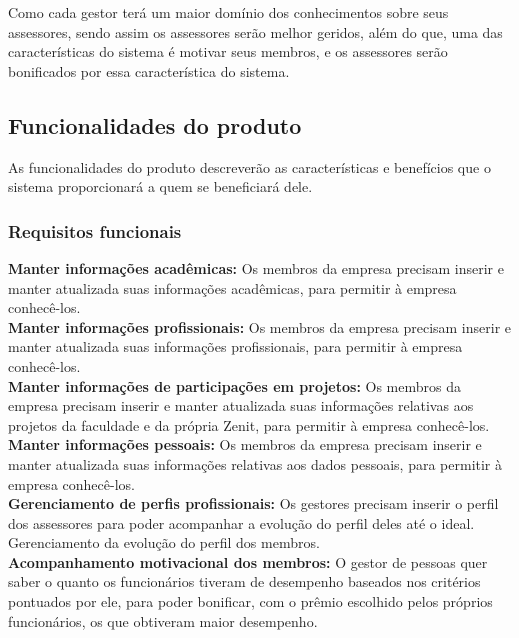 \begin{anexosenv}
Como cada gestor terá um maior domínio dos conhecimentos sobre seus assessores, sendo assim os assessores serão melhor geridos, além do que, uma das características do sistema é motivar seus membros, e os assessores serão bonificados por essa característica do sistema.\\

\subsection[Funcionalidades do produto]{Funcionalidades do produto}

As funcionalidades do produto descreverão as características e benefícios que o sistema proporcionará a quem se beneficiará dele.\\

\subsubsection[Requisitos funcionais]{Requisitos funcionais}

\textbf{Manter informações acadêmicas:} Os membros da empresa precisam inserir e manter atualizada suas informações acadêmicas, para permitir à empresa conhecê-los.\\

\textbf{Manter informações profissionais:} Os membros da empresa precisam inserir e manter atualizada suas informações profissionais, para permitir à empresa conhecê-los.\\

\textbf{Manter informações de participações em projetos:} Os membros da empresa precisam inserir e manter atualizada suas informações relativas aos projetos da faculdade e da própria Zenit, para permitir à empresa conhecê-los.\\

\textbf{Manter informações pessoais:} Os membros da empresa precisam inserir e manter atualizada suas informações relativas aos dados pessoais, para permitir à empresa conhecê-los.\\

\textbf{Gerenciamento de perfis profissionais:} Os gestores precisam inserir o perfil dos assessores para poder acompanhar a evolução do perfil deles até o ideal. Gerenciamento da evolução do perfil dos membros.\\

\textbf{Acompanhamento motivacional dos membros:} O gestor de pessoas quer saber o quanto os funcionários tiveram de desempenho baseados nos critérios pontuados por ele, para poder bonificar, com o prêmio escolhido pelos próprios funcionários, os que obtiveram maior desempenho.\\


\end{anexosenv}
